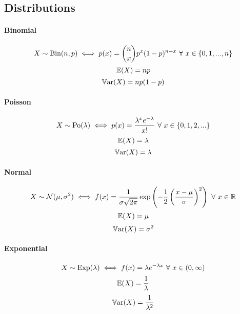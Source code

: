 \documentclass[a4paper]{article}
\begin{document}
        \subsection*{Distributions}
            \paragraph{Binomial}
                \[
                    X \sim \text{Bin}(n, p) \iff p(x) = {n\choose x} p^x (1 -
                    p)^{n - x} \,\,\forall\,\, x \in \{0, 1, ..., n\}
                \]
                \[
                    \mathbb{E}(X) = np
                \]
                \[
                    \mathbb{V}\text{ar}(X) = np(1 - p)
                \]

            \paragraph{Poisson}
                \[
                    X \sim \text{Po}(\lambda) \iff p(x) = \frac{\lambda^x
                    e^{-\lambda}}{x!} \,\,\forall\,\, x \in \{0, 1, 2, ...\}
                \]
                \[
                    \mathbb{E}(X) = \lambda
                \]
                \[
                    \mathbb{V}\text{ar}(X) = \lambda
                \]

            \paragraph{Normal}
                \[
                    X \sim \mathcal{N}(\mu, \sigma^2) \iff f(x) =
                    \frac{1}{\sigma\sqrt{2\pi}} \exp\left(-\frac{1}{2}\left(
                    \frac{x - \mu}{\sigma}\right)^2\right) \,\,\forall\,\, x \in \mathbb{R}
                \]
                \[
                    \mathbb{E}(X) = \mu
                \]
                \[
                    \mathbb{V}\text{ar}(X) = \sigma^2
                \]

            \paragraph{Exponential}
                \[
                    X \sim \text{Exp}(\lambda) \iff f(x) = \lambda e^{-\lambda
                    x} \,\,\forall\,\, x \in (0, \infty)
                \]
                \[
                    \mathbb{E}(X) = \frac{1}{\lambda}
                \]
                \[
                    \mathbb{V}\text{ar}(X) = \frac{1}{\lambda^2}
                \]
\end{document}
